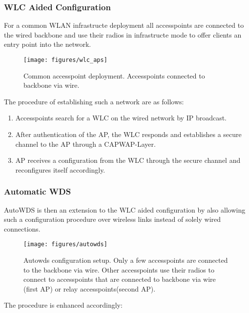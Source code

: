       \subsubsection{WLC Aided Configuration}
	For a common WLAN infrastructe deployment all accesspoints are connected to the wired backbone and use their radios in infrastructe mode to 
	offer clients an entry point into the network.
	\begin{figure}[h!]
	  \centering
	  \texttt{[image: figures/wlc\_aps]}
	  \caption{Common accesspoint deployment. Accesspoints connected to backbone via wire.}
	  \label{fig:wlc_aps}
	\end{figure}
	The procedure of establishing such a network are as follows:
	\begin{enumerate}
	 \item Accesspoints search for a \ac{WLC} on the wired network by IP broadcast.
	 \item After authentication of the \ac{AP}, the \ac{WLC} responds and establishes a secure channel to the \ac{AP} through a \ac{CAPWAP}-Layer.
	 \item \ac{AP} receives a configuration from the \ac{WLC} through the secure channel and reconfigures itself accordingly.
	\end{enumerate}
	
      \subsubsection{Automatic \ac{WDS}}
	\label{autowdsbasic}
	AutoWDS is then an extension to the WLC aided configuration by also allowing such a configuration procedure over wireless links instead of solely wired connections.
            
	\begin{figure}[h!]
	  \centering
	  \texttt{[image: figures/autowds]}
	  \caption{Autowds configuration setup. Only a few accesspoints are connected to the backbone via wire. 
	    Other accesspoints use their radios to connect to accesspoints that are connected to backbone via wire (first \ac{AP}) or relay accesspoints(second \ac{AP}).}
	  \label{fig:autowds}
	\end{figure}
	
	The procedure is enhanced accordingly:
	
